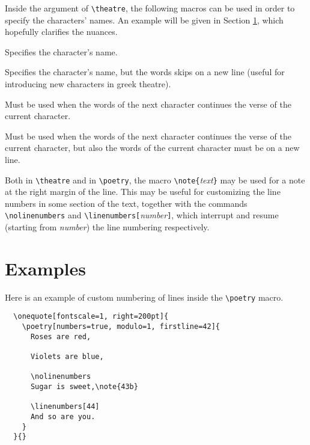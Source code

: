 \documentclass[11pt,a4paper]{article}
\begin{document}
	Inside the argument of \verb|\theatre|, the following macros can be used in order to specify the characters' names. An example will be given in Section \ref{examples}, which hopefully clarifies the nuances.
	\begin{description}[font=\normalfont]
		\item[\texttt{\textbackslash speak\{}\emph{Name}\texttt{\}}] Specifies the character's name.
		\item[\texttt{\textbackslash Speak\{}\emph{Name}\texttt{\}}] Specifies the character's name, but the words skips on a new line (useful for introducing new characters in greek theatre).
		\item[\texttt{\textbackslash emispeak\{}\emph{Name}\texttt{\}\{}\emph{words}\texttt{\}}] Must be used when the words of the next character continues the verse of the current character.
		\item[\texttt{\textbackslash emiSpeak\{}\emph{Name}\texttt{\}\{}\emph{words}\texttt{\}}] Must be used when the words of the next character continues the verse of the current character, but also the words of the current character must be on a new line.
	\end{description}

	Both in \verb|\theatre| and in \verb|\poetry|, the macro \verb|\note{|\emph{text}\verb|}| may be used for a note at the right margin of the line. This may be useful for customizing the line numbers in some section of the text, together with the commands \verb|\nolinenumbers| and \verb|\linenumbers[|\emph{number}\verb|]|, which interrupt and resume (starting from \emph{number}) the line numbering respectively.
	
	\newpage
  
  \section{Examples} \label{examples}
	
	Here is an example of custom numbering of lines inside the \verb|\poetry| macro.	
	
	\begin{verbatim}
  \onequote[fontscale=1, right=200pt]{
    \poetry[numbers=true, modulo=1, firstline=42]{
      Roses are red,
      
      Violets are blue,
      
      \nolinenumbers
      Sugar is sweet,\note{43b}
      
      \linenumbers[44]
      And so are you.
    }
  }{}
	\end{verbatim}
	
\end{document}

